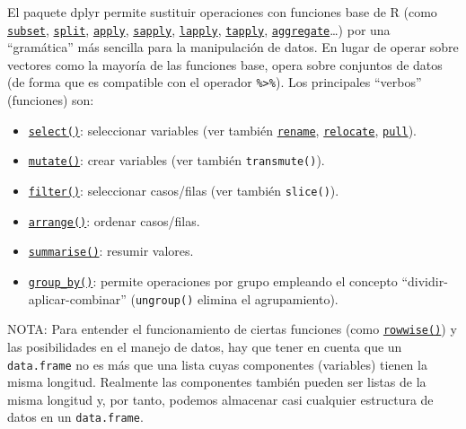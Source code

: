\documentclass[
]{book}
\theoremstyle{break}
\theoremstyle{nonumberplain}
\begin{document}
El paquete dplyr permite sustituir operaciones con funciones base de R (como \href{https://www.rdocumentation.org/search?q=subset}{\texttt{subset}}, \href{https://www.rdocumentation.org/search?q=split}{\texttt{split}}, \href{https://www.rdocumentation.org/search?q=apply}{\texttt{apply}}, \href{https://www.rdocumentation.org/search?q=sapply}{\texttt{sapply}}, \href{https://www.rdocumentation.org/search?q=lapply}{\texttt{lapply}}, \href{https://www.rdocumentation.org/search?q=tapply}{\texttt{tapply}}, \href{https://www.rdocumentation.org/search?q=aggregate}{\texttt{aggregate}}\ldots) por una ``gramática'' más sencilla para la manipulación de datos.
En lugar de operar sobre vectores como la mayoría de las funciones base,
opera sobre conjuntos de datos (de forma que es compatible con el operador \texttt{\%\textgreater{}\%}).
Los principales ``verbos'' (funciones) son:

\begin{itemize}
\item
  \href{https://dplyr.tidyverse.org/reference/select.html}{\texttt{select()}}: seleccionar variables (ver también \href{https://dplyr.tidyverse.org/reference/rename.html}{\texttt{rename}}, \href{https://dplyr.tidyverse.org/reference/relocate.html}{\texttt{relocate}}, \href{https://dplyr.tidyverse.org/reference/pull.html}{\texttt{pull}}).
\item
  \href{https://dplyr.tidyverse.org/reference/mutate.html}{\texttt{mutate()}}: crear variables (ver también \texttt{transmute()}).
\item
  \href{https://dplyr.tidyverse.org/reference/filter.html}{\texttt{filter()}}: seleccionar casos/filas (ver también \texttt{slice()}).
\item
  \href{https://dplyr.tidyverse.org/reference/arrange.html}{\texttt{arrange()}}: ordenar casos/filas.
\item
  \href{https://dplyr.tidyverse.org/reference/summarise.html}{\texttt{summarise()}}: resumir valores.
\item
  \href{https://dplyr.tidyverse.org/reference/group_by.html}{\texttt{group\_by()}}: permite operaciones por grupo empleando el concepto ``dividir-aplicar-combinar'' (\texttt{ungroup()} elimina el agrupamiento).
\end{itemize}

NOTA: Para entender el funcionamiento de ciertas funciones (como \href{https://dplyr.tidyverse.org/reference/rowwise.html}{\texttt{rowwise()}}) y las posibilidades en el manejo de datos, hay que tener en cuenta que un \texttt{data.frame} no es más que una lista cuyas componentes (variables) tienen la misma longitud.
Realmente las componentes también pueden ser listas de la misma longitud y, por tanto, podemos almacenar casi cualquier estructura de datos en un \texttt{data.frame}.
\end{document}
